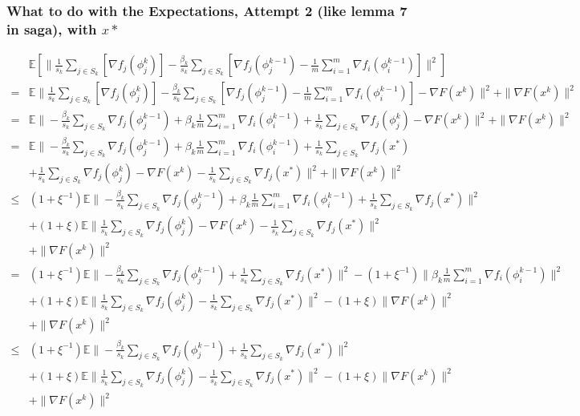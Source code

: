 \documentclass[11pt]{article}
\begin{document}
\subsubsection{What to do with the Expectations, Attempt 2 (like lemma 7 in saga), with $x*$}
\begin{align*}
 & \mathbb{E} \left[  \|\frac{1}{s_k} \sum_{j \in S_k} \left[  \nabla f_j(\phi_j^{k}) \right]- \frac{ \beta_k }{s_k} \sum_{j \in S_k} \left[  \nabla f_j(\phi^{k-1}_j) - \frac{1}{m} \sum_{i = 1}^{m }  \nabla f_i (\phi_i^{k-1}) \right]  \|^2 \right] \\
= &  \mathbb{E}   \|\frac{1}{s_k} \sum_{j \in S_k} \left[  \nabla f_j(\phi_j^{k}) \right]- \frac{ \beta_k }{s_k} \sum_{j \in S_k} \left[  \nabla f_j(\phi^{k-1}_j) - \frac{1}{m} \sum_{i = 1}^{m }  \nabla f_i (\phi_i^{k-1})  \right] - \nabla F (x^k) \|^2   +  \|\nabla F (x^k) \|^2 \\
= &  \mathbb{E}   \|  - \frac{ \beta_k }{s_k} \sum_{j \in S_k}  \nabla f_j(\phi^{k-1}_j) +   \beta_k \frac{1}{m} \sum_{i = 1}^{m }  \nabla f_i (\phi_i^{k-1}) +\frac{1}{s_k} \sum_{j \in S_k}  \nabla f_j(\phi_j^{k}) - \nabla F (x^k) \|^2   +  \|\nabla F (x^k) \|^2 \\
= &  \mathbb{E}   \|  - \frac{ \beta_k }{s_k} \sum_{j \in S_k}  \nabla f_j(\phi^{k-1}_j) +   \beta_k \frac{1}{m} \sum_{i = 1}^{m }  \nabla f_i (\phi_i^{k-1})+\frac{1 }{s_k} \sum_{j \in S_k}  \nabla f_j(x^*) \\
& +\frac{1}{s_k} \sum_{j \in S_k}  \nabla f_j(\phi_j^{k}) - \nabla F (x^k) - \frac{ 1}{s_k} \sum_{j \in S_k}  \nabla f_j(x^*)\|^2   +  \|\nabla F (x^k) \|^2 \\
\leq  &  (1+\xi^{-1})\mathbb{E}   \|  - \frac{ \beta_k }{s_k} \sum_{j \in S_k}  \nabla f_j(\phi^{k-1}_j) +   \beta_k \frac{1}{m} \sum_{i = 1}^{m }  \nabla f_i (\phi_i^{k-1})  +\frac{ 1 }{s_k} \sum_{j \in S_k}  \nabla f_j(x^*)\|^2  \\
&+ (1+\xi) \mathbb{E} \| \frac{1}{s_k} \sum_{j \in S_k}  \nabla f_j(\phi_j^{k}) - \nabla F (x^k) -\frac{ 1}{s_k} \sum_{j \in S_k}  \nabla f_j(x^*)\|^2   \\
& +  \|\nabla F (x^k) \|^2 \\
= &  (1+\xi^{-1})\mathbb{E}   \|  - \frac{ \beta_k }{s_k} \sum_{j \in S_k}  \nabla f_j(\phi^{k-1}_j) + \frac{ 1 }{s_k} \sum_{j \in S_k}  \nabla f_j(x^*)\|^2  -(1+\xi^{-1})\| \beta_k \frac{1}{m} \sum_{i = 1}^{m }  \nabla f_i (\phi_i^{k-1})  \|^2\\
&+ (1+\xi) \mathbb{E} \| \frac{1}{s_k} \sum_{j \in S_k}  \nabla f_j(\phi_j^{k}) - \frac{ 1 }{s_k} \sum_{j \in S_k}  \nabla f_j(x^*)\|^2  - (1+\xi) \|  \nabla F (x^k) \|^2   \\
& +  \|\nabla F (x^k) \|^2 \\
\leq &  (1+\xi^{-1})\mathbb{E}   \|  - \frac{ \beta_k }{s_k} \sum_{j \in S_k}  \nabla f_j(\phi^{k-1}_j) + \frac{ 1}{s_k} \sum_{j \in S_k}  \nabla f_j(x^*)\|^2 \\
&+ (1+\xi) \mathbb{E} \| \frac{1}{s_k} \sum_{j \in S_k}  \nabla f_j(\phi_j^{k}) - \frac{ 1 }{s_k} \sum_{j \in S_k}  \nabla f_j(x^*)\|^2  - (1+\xi) \|  \nabla F (x^k) \|^2   \\
& +  \|\nabla F (x^k) \|^2 \\
\end{align*}
\end{document}
